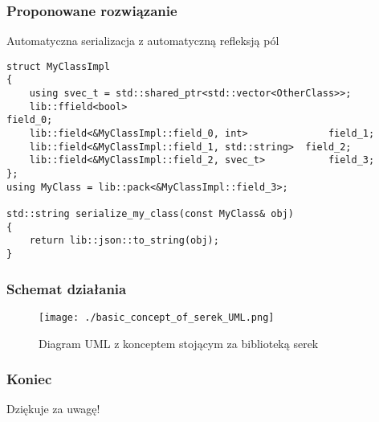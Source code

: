 \documentclass[12pt]{beamer}
\begin{document}
	\begin{frame}[fragile]
		\frametitle{Proponowane rozwiązanie}

		Automatyczna serializacja z automatyczną refleksją pól\newline

		\begin{lstlisting}[frame=single]
struct MyClassImpl
{
	using svec_t = std::shared_ptr<std::vector<OtherClass>>;
	lib::ffield<bool>											field_0;
	lib::field<&MyClassImpl::field_0, int>				field_1;
	lib::field<&MyClassImpl::field_1, std::string> 	field_2;
	lib::field<&MyClassImpl::field_2, svec_t>			field_3;
};
using MyClass = lib::pack<&MyClassImpl::field_3>;

std::string serialize_my_class(const MyClass& obj)
{
	return lib::json::to_string(obj);
}
		\end{lstlisting}

	\end{frame}

	\begin{frame}
		\frametitle{Schemat działania}

		\begin{figure}[ht!]
			\centering
			\texttt{[image: ./basic\_concept\_of\_serek\_UML.png]}
			\caption{Diagram UML z konceptem stojącym za biblioteką serek}
		\end{figure}

	\end{frame}

	\begin{frame}
		\frametitle{Koniec}

		\centering\Huge Dziękuje za uwagę!

	\end{frame}
\end{document}
